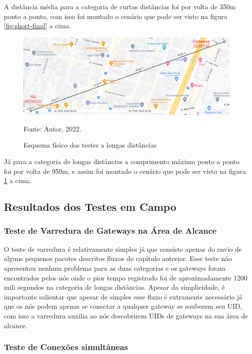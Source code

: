 \newpage

A distância média para a categoria de curtas distâncias foi por volta de 350m ponto
a ponto, com isso foi montado o cenário que pode ser visto na figura \ref{fig:short-final} a cima.

\begin{figure}[H]
    \centering
	\caption{Esquema físico dos testes a longas distâncias}
    \includegraphics[width=\textwidth,keepaspectratio]{img/long-final.png}
    \label{fig:long-final}
    
    Fonte: Autor, 2022.
\end{figure}

Já para a categoria de longas distâncias a comprimento máximo ponto a ponto foi por volta de 950m,
e assim foi montado o cenário que pode ser visto na figura \ref{fig:long-final} a cima.

\subsection{Resultados dos Testes em Campo}

\subsubsection{Teste de Varredura de Gateways na Área de Alcance}

O teste de varredura é relativamente simples já que consiste apenas do envio de alguns
pequenos pacotes descritos fluxos do capítulo anterior. Esse teste não apresentou nenhum
problema para as duas categorias e os gateways foram encontrados pelos nós onde
o pior tempo registrado foi de aproximadamente 1200 mili segundos na categoria de longas
distâncias. Apesar da simplicidade, é importante salientar que apesar de simples esse fluxo
é extramente necessário já que os nós podem apenas se conectar a qualquer gateway
se souberem seu UID, com isso a varredura auxilia ao nós descobrirem UIDs de gateways
na sua área de alcance.

\subsubsection{Teste de Conexões simultâneas}

